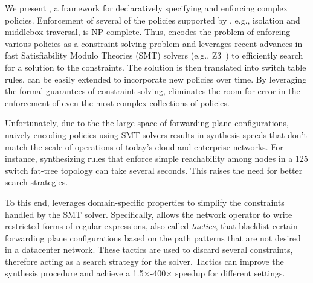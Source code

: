 We present \Name, a framework for declaratively specifying and
enforcing complex policies. Enforcement of several of
the policies supported by \Name, e.g., isolation and middlebox
traversal, is NP-complete. Thus, \Name 
encodes the problem of enforcing various
policies as a constraint solving problem and
leverages recent advances in
fast Satisfiability Modulo Theories (SMT) solvers (e.g., Z3~\cite{z3})
to efficiently search for a solution to the constraints. 
The solution is then translated into switch table rules. %
\Name can be easily extended to incorporate new policies over time. By
leveraging the formal guarantees of constraint solving, \Name
eliminates the room for error in the enforcement of even the most
complex collections of policies.

Unfortunately, 
due to the the large space of forwarding plane configurations,
naively encoding policies using SMT solvers results in
synthesis speeds that don't match the scale of operations of 
today's cloud and enterprise networks.
For instance, synthesizing 
rules that enforce simple
reachability among nodes in a 125 switch fat-tree topology can take
several seconds. This raises the need for better search strategies.

To this
end, \Name leverages domain-specific properties to simplify the
constraints handled by the SMT solver.  Specifically, \Name allows the
network operator to write 
restricted forms of regular expressions, also called \emph{tactics}, 
that blacklist certain
forwarding plane configurations based on the path patterns   
that are not desired in a datacenter network. 
These tactics are used to discard several constraints, therefore
acting as a search strategy for the solver.
Tactics can improve the synthesis procedure and achieve
a 1.5$\times$-400$\times$ speedup for different settings.

